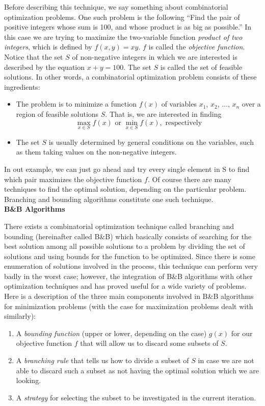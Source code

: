 Before describing this technique, we say something about combinatorial optimization problems. One such problem is the following ``Find the pair of positive integers whose sum is 100, and whose product is as big as possible.'' In this case we are trying to maximize the two-variable function \emph{product of two integers}, which is defined by $f(x,y) = xy$. $f$ is called the \emph{objective function}. Notice that the set $S$ of non-negative integers in which we are interested is described by the equation $x + y = 100$. The set $S$ is called the set of feasible solutions. In other words, a combinatorial optimization problem consists of these ingredients:
	\begin{itemize}
	\item The problem is to minimize a function $f(x)$ of variables $x_1$, $x_2$, $\ldots$, $x_n$ over a region of feasible solutions $S$. That is, we are interested in finding 
	\[
	\max_{x \in S} f(x) \text{ or } \min_{x \in S} f(x), \text{ respectively}
	\]
	\item The set $S$ is usually determined by general conditions on the variables, such as them taking values on the non-negative integers.
	\end{itemize}

In out example, we can just go ahead and try every single element in S to find which pair maximizes the objective function $f$. Of course there are many techniques to find the optimal solution, depending on the particular problem. Branching and bounding algorithms constitute one such technique. \\


\noindent\textbf{\large B\&B Algorithms}

There exists a combinatorial optimization technique called branching and bounding (hereinafter called B\&B) which basically consists of searching for the best solution among all possible solutions to a problem by dividing the set of solutions and using bounds for the function to be optimized. Since there is some enumeration of solutions involved in the process, this technique can perform very badly in the worst case; however, the integration of B\&B algorithms with other optimization techniques and has proved useful for a wide variety of problems. \\

Here is a description of the three main components involved in B\&B algorithms for minimization problems (with the case for maximization problems dealt with similarly):
	\begin{enumerate}[1.]
	\item A \emph{bounding function} (upper or lower, depending on the case) $g(x)$ for our objective function $f$ that will allow us to discard some subsets of $S$.
	\item A \emph{branching rule} that tells us how to divide a subset of $S$ in case we are not able to discard such a subset as not having the optimal solution which we are looking.
	\item A \emph{strategy} for selecting the subset to be investigated in the current iteration. 
	\end{enumerate}


